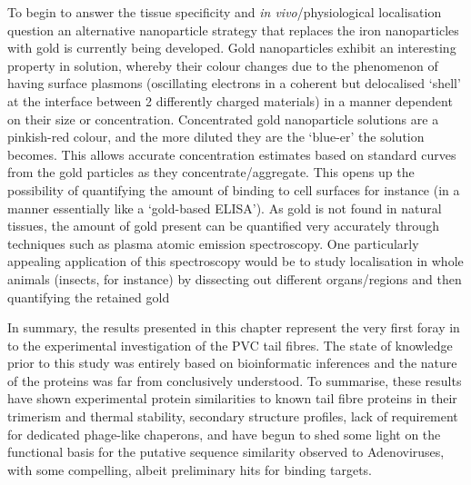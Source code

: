 To begin to answer the tissue specificity and \emph{in vivo}/physiological localisation question an alternative nanoparticle strategy that replaces the iron nanoparticles with gold is currently being developed. Gold nanoparticles exhibit an interesting property in solution, whereby their colour changes due to the phenomenon of having surface plasmons (oscillating electrons in a coherent but delocalised `shell' at the interface between 2 differently charged materials) in a manner dependent on their size or concentration. Concentrated gold nanoparticle solutions are a pinkish-red colour, and the more diluted they are the `blue-er' the solution becomes. This allows accurate concentration estimates based on standard curves from the gold particles as they concentrate/aggregate. This opens up the possibility of quantifying the amount of binding to cell surfaces for instance (in a manner essentially like a `gold-based ELISA'). As gold is not found in natural tissues, the amount of gold present can be quantified very accurately through techniques such as plasma atomic emission spectroscopy. One particularly appealing application of this spectroscopy would be to study localisation in whole animals (insects, for instance) by dissecting out different organs/regions and then quantifying the retained gold

In summary, the results presented in this chapter represent the very first foray in to the experimental investigation of the PVC tail fibres. The state of knowledge prior to this study was entirely based on bioinformatic inferences and the nature of the proteins was far from conclusively understood. To summarise, these results have shown experimental protein similarities to known tail fibre proteins in their trimerism and thermal stability, secondary structure profiles, lack of requirement for dedicated phage-like chaperons, and have begun to shed some light on the functional basis for the putative sequence similarity observed to Adenoviruses, with some compelling, albeit preliminary hits for binding targets.